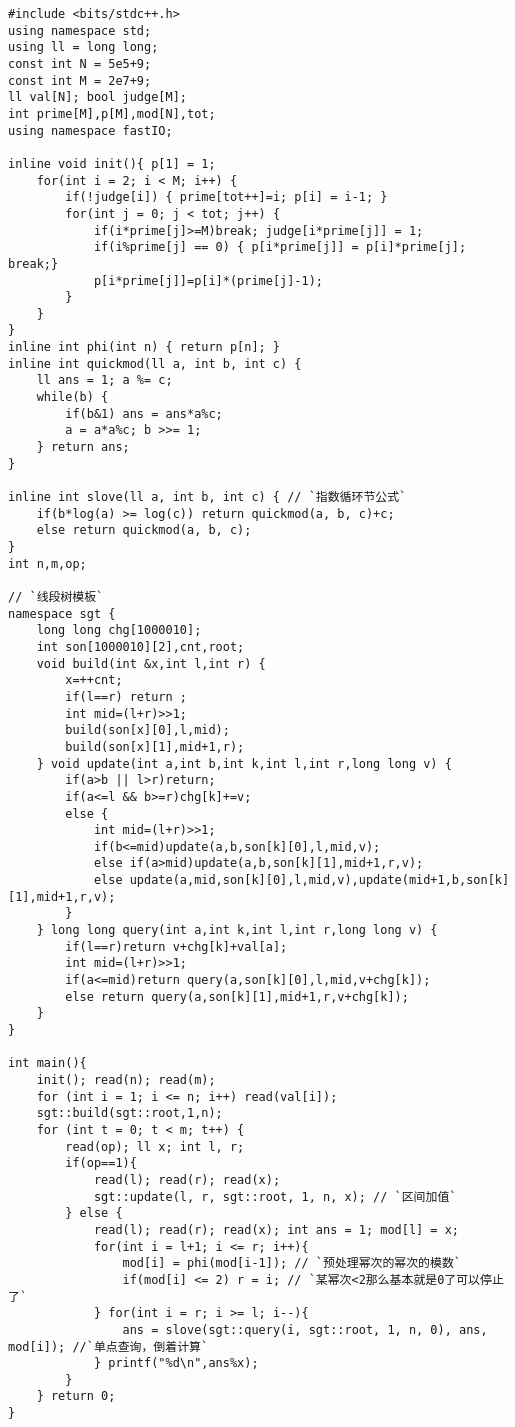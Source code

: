 \begin{lstlisting}
#include <bits/stdc++.h>
using namespace std;
using ll = long long;
const int N = 5e5+9;
const int M = 2e7+9;
ll val[N]; bool judge[M];
int prime[M],p[M],mod[N],tot;
using namespace fastIO;

inline void init(){ p[1] = 1;
    for(int i = 2; i < M; i++) {
        if(!judge[i]) { prime[tot++]=i; p[i] = i-1; }
        for(int j = 0; j < tot; j++) {
            if(i*prime[j]>=M)break; judge[i*prime[j]] = 1;
            if(i%prime[j] == 0) { p[i*prime[j]] = p[i]*prime[j]; break;} 
            p[i*prime[j]]=p[i]*(prime[j]-1);
        }
    }
}
inline int phi(int n) { return p[n]; }
inline int quickmod(ll a, int b, int c) {
    ll ans = 1; a %= c;
    while(b) {
        if(b&1) ans = ans*a%c;
        a = a*a%c; b >>= 1;
    } return ans;
}

inline int slove(ll a, int b, int c) { // `指数循环节公式`
    if(b*log(a) >= log(c)) return quickmod(a, b, c)+c;
    else return quickmod(a, b, c);
}
int n,m,op;

// `线段树模板`
namespace sgt {
    long long chg[1000010];
    int son[1000010][2],cnt,root;
    void build(int &x,int l,int r) {
        x=++cnt;
        if(l==r) return ;
        int mid=(l+r)>>1;
        build(son[x][0],l,mid);
        build(son[x][1],mid+1,r);
    } void update(int a,int b,int k,int l,int r,long long v) {
        if(a>b || l>r)return;
        if(a<=l && b>=r)chg[k]+=v;
        else {
            int mid=(l+r)>>1;
            if(b<=mid)update(a,b,son[k][0],l,mid,v);
            else if(a>mid)update(a,b,son[k][1],mid+1,r,v);
            else update(a,mid,son[k][0],l,mid,v),update(mid+1,b,son[k][1],mid+1,r,v);
        }
    } long long query(int a,int k,int l,int r,long long v) {
        if(l==r)return v+chg[k]+val[a];
        int mid=(l+r)>>1;
        if(a<=mid)return query(a,son[k][0],l,mid,v+chg[k]);
        else return query(a,son[k][1],mid+1,r,v+chg[k]);
    }
}

int main(){ 
    init(); read(n); read(m);
    for (int i = 1; i <= n; i++) read(val[i]);
    sgt::build(sgt::root,1,n);
    for (int t = 0; t < m; t++) {
        read(op); ll x; int l, r;
        if(op==1){
            read(l); read(r); read(x);
            sgt::update(l, r, sgt::root, 1, n, x); // `区间加值`
        } else {
            read(l); read(r); read(x); int ans = 1; mod[l] = x;
            for(int i = l+1; i <= r; i++){
                mod[i] = phi(mod[i-1]); // `预处理幂次的幂次的模数`
                if(mod[i] <= 2) r = i; // `某幂次<2那么基本就是0了可以停止了`
            } for(int i = r; i >= l; i--){
                ans = slove(sgt::query(i, sgt::root, 1, n, 0), ans, mod[i]); //`单点查询，倒着计算`
            } printf("%d\n",ans%x);
        }
    } return 0;
}
\end{lstlisting}


